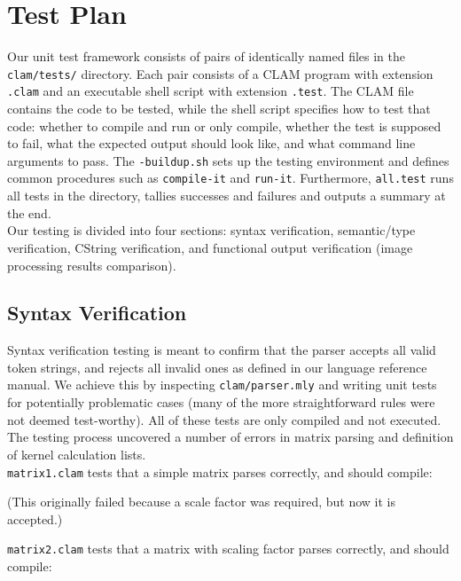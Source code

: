 \chapter{Test Plan}
\label{chap:testplan}

Our unit test framework consists of pairs of identically named files in the \texttt{clam/tests/} directory.
Each pair consists of a CLAM program with extension \texttt{.clam} and an executable shell script
with extension \texttt{.test}. The CLAM file contains the code to be tested, while the shell script
specifies how to test that code: whether to compile and run or only compile, whether the test is supposed to fail,
what the expected output should look like, and what command line arguments to pass.
The \texttt{-buildup.sh} sets up the testing environment and defines common procedures such as
\texttt{compile-it} and \texttt{run-it}. Furthermore, \texttt{all.test} runs all tests in the directory,
tallies successes and failures and outputs a summary at the end.\\

Our testing is divided into four sections: syntax verification, semantic/type verification, CString verification, and functional output verification (image processing results comparison). 

\section{Syntax Verification}
\label{testing:syntax}

Syntax verification testing is meant to confirm that the parser accepts all valid token strings,
and rejects all invalid ones as defined in our language reference manual.
We achieve this by inspecting \texttt{clam/parser.mly} and writing unit tests for
potentially problematic cases (many of the more straightforward rules were not deemed test-worthy).
All of these tests are only compiled and not executed. The testing process uncovered a number of errors
in matrix parsing and definition of kernel calculation lists.\\

\texttt{matrix1.clam} tests that a simple matrix parses correctly, and should compile:

(This originally failed because a scale factor was required, but now it is accepted.)

\texttt{matrix2.clam} tests that a matrix with scaling factor parses correctly, and should compile:


